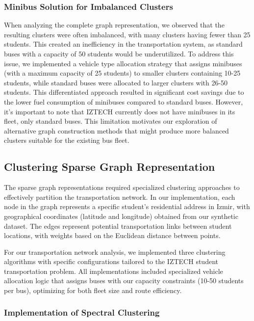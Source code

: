 \subsubsection{Minibus Solution for Imbalanced Clusters}
\label{subsubsec:minibus_solution}

When analyzing the complete graph representation, we observed that the resulting clusters were often imbalanced, with many clusters having fewer than 25 students. This created an inefficiency in the transportation system, as standard buses with a capacity of 50 students would be underutilized. To address this issue, we implemented a vehicle type allocation strategy that assigns minibuses (with a maximum capacity of 25 students) to smaller clusters containing 10-25 students, while standard buses were allocated to larger clusters with 26-50 students. This differentiated approach resulted in significant cost savings due to the lower fuel consumption of minibuses compared to standard buses. However, it's important to note that IZTECH currently does not have minibuses in its fleet, only standard buses. This limitation motivates our exploration of alternative graph construction methods that might produce more balanced clusters suitable for the existing bus fleet.

\subsection{Clustering Sparse Graph Representation}
\label{subsec:clustering_sparse}

The sparse graph representations required specialized clustering approaches to effectively partition the transportation network. In our implementation, each node in the graph represents a specific student's residential address in Izmir, with geographical coordinates (latitude and longitude) obtained from our synthetic dataset. The edges represent potential transportation links between student locations, with weights based on the Euclidean distance between points.

For our transportation network analysis, we implemented three clustering algorithms with specific configurations tailored to the IZTECH student transportation problem. All implementations included specialized vehicle allocation logic that assigns buses with our capacity constraints (10-50 students per bus), optimizing for both fleet size and route efficiency.

\subsubsection{Implementation of Spectral Clustering}
\label{subsubsec:spectral_implementation}

